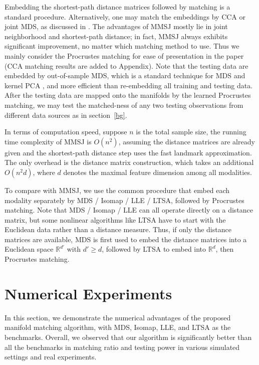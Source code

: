 \documentclass[times,twocolumn,final]{elsarticle}
\begin{document}
Embedding the shortest-path distance matrices followed by matching is a standard procedure. Alternatively, one may match the embeddings by CCA or joint MDS, as discussed in \citep{PriebeMarchette2012, FishkindShenPriebe2016}. The advantages of MMSJ mostly lie in joint neighborhood and shortest-path distance; in fact, MMSJ always exhibits significant improvement, no matter which matching method to use. Thus we mainly consider the Procrustes matching for ease of presentation in the paper (CCA matching results are added to Appendix). Note that the testing data are embedded by out-of-sample MDS, which is a standard technique for MDS and kernel PCA \citep{ScholkopfSmolaMuller1998,BengioEtal2003,TrossetPriebe2008}, and more efficient than re-embedding all training and testing data. After the testing data are mapped onto the manifolds by the learned Procrustes matching, we may test the matched-ness of any two testing observations from different data sources as in section~\ref{bg}.

In terms of computation speed, suppose $n$ is the total sample size, the running time complexity of MMSJ is $O(n^2)$, assuming the distance matrices are already given and the shortest-path distance step uses the fast landmark approximation. The only overhead is the distance matrix construction, which takes an additional $O(n^2 d)$, where $d$ denotes the maximal feature dimension among all modalities.

To compare with MMSJ, we use the common procedure that embed each modality separately by MDS / Isomap / LLE / LTSA, followed by Procrustes matching. Note that MDS / Isomap / LLE can all operate directly on a distance matrix, but some nonlinear algorithms like LTSA have to start with the Euclidean data rather than a distance measure. Thus, if only the distance matrices are available, MDS is first used to embed the distance matrices into a Euclidean space $\mathbb{R}^{d'}$ with $d' \geq d$, followed by LTSA to embed into $\mathbb{R}^{d}$, then Procrustes matching.

\section{Numerical Experiments}
\label{numer}
In this section, we demonstrate the numerical advantages of the proposed manifold matching algorithm, with MDS, Isomap, LLE, and LTSA as the benchmarks. Overall, we observed that our algorithm is significantly better than all the benchmarks in matching ratio and testing power in various simulated settings and real experiments.
\end{document}
